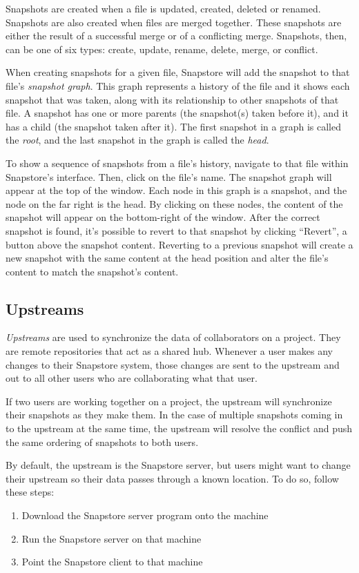 Snapshots are created when a file is updated, created, deleted or renamed. Snapshots are also created when files are merged together. These snapshots are either the result of a successful merge or of a conflicting merge. Snapshots, then, can be one of six types: create, update, rename, delete, merge, or conflict.

When creating snapshots for a given file, Snapstore will add the snapshot to that file's \textit{snapshot graph}. This graph represents a history of the file and it shows each snapshot that was taken, along with its relationship to other snapshots of that file. A snapshot has one or more parents (the snapshot(s) taken before it), and it has a child (the snapshot taken after it). The first snapshot in a graph is called the \textit{root}, and the last snapshot in the graph is called the \textit{head}.

To show a sequence of snapshots from a file's history, navigate to that file within Snapstore's interface. Then, click on the file's name. The snapshot graph will appear at the top of the window. Each node in this graph is a snapshot, and the node on the far right is the head. By clicking on these nodes, the content of the snapshot will appear on the bottom-right of the window. After the correct snapshot is found, it's possible to revert to that snapshot by clicking ``Revert'', a button above the snapshot content. Reverting to a previous snapshot will create a new snapshot with the same content at the head position and alter the file's content to match the snapshot's content.

\subsection{Upstreams}

\textit{Upstreams} are used to synchronize the data of collaborators on a project. They are remote repositories that act as a shared hub. Whenever a user makes any changes to their Snapstore system, those changes are sent to the upstream and out to all other users who are collaborating what that user.

If two users are working together on a project, the upstream will synchronize their snapshots as they make them. In the case of multiple snapshots coming in to the upstream at the same time, the upstream will resolve the conflict and push the same ordering of snapshots to both users.

By default, the upstream is the Snapstore server, but users might want to change their upstream so their data passes through a known location. To do so, follow these steps:
\begin{enumerate}
  \item{Download the Snapstore server program onto the machine}
  \item{Run the Snapstore server on that machine}
  \item{Point the Snapstore client to that machine}
\end{enumerate}

